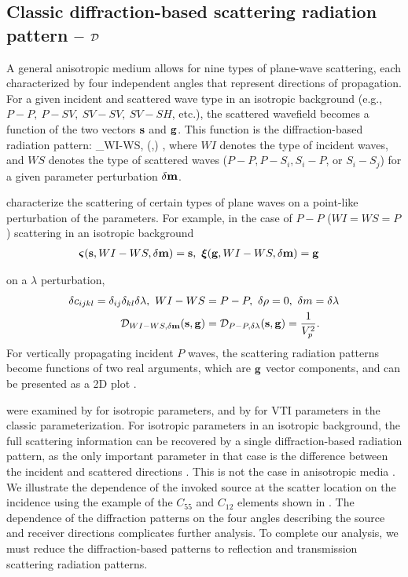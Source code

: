 \subsection{Classic diffraction-based scattering radiation pattern -- $\mathcal{D}$} 
A general anisotropic medium allows for nine types of plane-wave scattering, 
each characterized by four independent angles that represent directions of 
propagation.
For a given incident and scattered wave type in an isotropic background (e.g., $P-P,~ P-SV,~SV-SV,~SV-SH$, 
etc.), the scattered wavefield becomes a function of the two vectors $\mathbf{s}$ and 
$\mathbf{g}$. This function is the diffraction-based radiation pattern:
\beq
\Dp_{WI-WS, \delta \mv}(\sv,\gv) \equiv {},
\eeq
where $WI$ denotes the type of incident waves, and $WS$ denotes the type of scattered 
waves ($P-P, P-S_i, S_i-P$, or $S_i-S_j$) for a given parameter perturbation 
$\delta \mathbf{m}$. 



\DP characterize the scattering of certain 
types of plane waves on a point-like perturbation of the parameters. For example, in the case of $P-P$ ($WI=WS=P$) scattering in an isotropic background 
\begin{align}
\bm{\varsigma}(\mathbf{s}, {WI-WS, \delta \mathbf{m}}) &= \mathbf{s},~ 
\bm{\xi} (\mathbf{g}, {WI-WS, \delta \mathbf{m}})  = \mathbf{g} 
\end{align}

on a $\lambda$ 
perturbation,
\begin{align}
	\delta c_{ijkl} = \delta_{ij} \delta_{kl} \delta \lambda, ~
	WI-WS &= P-P, ~
	\delta \rho = 0,~ \delta m = \delta \lambda \\
	\mathcal{D}_{WI-WS, \delta \mathbf{m}} (\mathbf{s},\mathbf{g}) &= \mathcal{D}_{P-P,\delta\lambda} (\mathbf{s},\mathbf{g}) = \frac{1}{V_p^2}.
\end{align}
For vertically propagating incident $P$ waves, the scattering radiation 
patterns become functions of two real arguments, which are $\mathbf{g}$ vector components, 
and can be presented as a 2D plot \citep{eaton1994}.


\DP were examined by \cite{wu1985,tarantola1986,beylkin1990} for isotropic 
parameters, 
and by \cite{calvet2006} for VTI parameters in the classic \cite{thomsen1986}
parameterization. For isotropic parameters in an isotropic background, the full
scattering information can be recovered by a single  diffraction-based  radiation  pattern, as the only 
important parameter in that case is the difference between the incident and 
scattered directions \citep{wu1985,tarantola1986}. This is not the case in anisotropic media \citep[e.g.,][]{eaton1994,calvet2006,juwon2016}. We illustrate the dependence of the invoked source at the scatter location on the incidence using the example of the $C_{55}$ and $C_{12}$ elements shown in . The dependence of the diffraction patterns on the four angles describing the source and receiver directions complicates further analysis. To complete our analysis, we must reduce the diffraction-based patterns to reflection and transmission scattering radiation patterns. 

